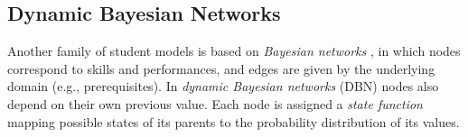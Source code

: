 %
%
%
%
%



\subsection{Dynamic Bayesian Networks}
\label{sec:dbn}

Another family of student models is based on \emph{Bayesian networks} \cite{probabilistic-ai},
in which nodes correspond to skills and performances,
and edges are given by the underlying domain (e.g., prerequisites).
In \emph{dynamic Bayesian networks} (DBN) \cite{dbn} nodes also depend
on their own previous value. %
Each node is assigned a \emph{state function} mapping possible states of its
parents to the probability distribution of its values.  %



